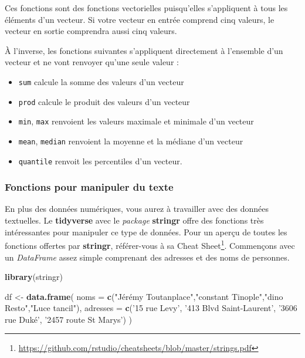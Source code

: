 \documentclass[
  11pt,
  french,
]{book}
\makeatletter
\newenvironment{Shaded}{\begin{snugshade}}{\end{snugshade}}
\newcommand{\DataTypeTok}[1]{\textcolor[rgb]{0.13,0.29,0.53}{#1}}
\newcommand{\KeywordTok}[1]{\textcolor[rgb]{0.13,0.29,0.53}{\textbf{#1}}}
\newcommand{\NormalTok}[1]{#1}
\newcommand{\StringTok}[1]{\textcolor[rgb]{0.31,0.60,0.02}{#1}}
\providecommand{\tightlist}{%
  \setlength{\itemsep}{0pt}\setlength{\parskip}{0pt}}
\renewcommand{\href}[2]{#2\footnote{\url{#1}}}
\newenvironment{kframe}{%
\medskip{}
\setlength{\fboxsep}{.8em}
 \def\at@end@of@kframe{}%
 \ifinner\ifhmode%
  \def\at@end@of@kframe{\end{minipage}}%
  \begin{minipage}{\columnwidth}%
 \fi\fi%
 \def\FrameCommand##1{\hskip\@totalleftmargin \hskip-\fboxsep
 \colorbox{shadecolor}{##1}\hskip-\fboxsep
     \hskip-\linewidth \hskip-\@totalleftmargin \hskip\columnwidth}%
 \MakeFramed {\advance\hsize-\width
   \@totalleftmargin\z@ \linewidth\hsize
   \@setminipage}}%
 {\par\unskip\endMakeFramed%
 \at@end@of@kframe}
\renewenvironment{Shaded}{\begin{kframe}}{\end{kframe}}
\makeatother
\begin{document}
Ces fonctions sont des fonctions vectorielles puisqu'elles s'appliquent à tous les éléments d'un vecteur. Si votre vecteur en entrée comprend cinq valeurs, le vecteur en sortie comprendra aussi cinq valeurs.

À l'inverse, les fonctions suivantes s'appliquent directement à l'ensemble d'un vecteur et ne vont renvoyer qu'une seule valeur :

\begin{itemize}
\tightlist
\item
  \texttt{sum} calcule la somme des valeurs d'un vecteur
\item
  \texttt{prod} calcule le produit des valeurs d'un vecteur
\item
  \texttt{min}, \texttt{max} renvoient les valeurs maximale et minimale d'un vecteur
\item
  \texttt{mean}, \texttt{median} renvoient la moyenne et la médiane d'un vecteur
\item
  \texttt{quantile} renvoit les percentiles d'un vecteur.
\end{itemize}

\hypertarget{sect01425}{%
\subsubsection{Fonctions pour manipuler du texte}\label{sect01425}}

En plus des données numériques, vous aurez à travailler avec des données textuelles. Le \textbf{tidyverse} avec le \emph{package} \textbf{stringr} offre des fonctions très intéressantes pour manipuler ce type de données. Pour un aperçu de toutes les fonctions offertes par \textbf{stringr}, référer-vous à sa \href{https://github.com/rstudio/cheatsheets/blob/master/strings.pdf}{Cheat Sheet}. Commençons avec un \emph{DataFrame} assez simple comprenant des adresses et des noms de personnes.

\begin{Shaded}
\begin{Highlighting}[]
\KeywordTok{library}\NormalTok{(stringr)}

\NormalTok{df <-}\StringTok{ }\KeywordTok{data.frame}\NormalTok{(}
  \DataTypeTok{noms =} \KeywordTok{c}\NormalTok{(}\StringTok{"Jérémy Toutanplace"}\NormalTok{,}\StringTok{"constant Tinople"}\NormalTok{,}\StringTok{"dino Resto"}\NormalTok{,}\StringTok{"Luce tancil"}\NormalTok{),}
  \DataTypeTok{adresses =} \KeywordTok{c}\NormalTok{(}\StringTok{'15 rue Levy'}\NormalTok{, }\StringTok{'413 Blvd Saint-Laurent'}\NormalTok{, }\StringTok{'3606 rue Duké'}\NormalTok{, }\StringTok{'2457 route St Marys'}\NormalTok{)}
\NormalTok{)}
\end{Highlighting}
\end{Shaded}
\end{document}
